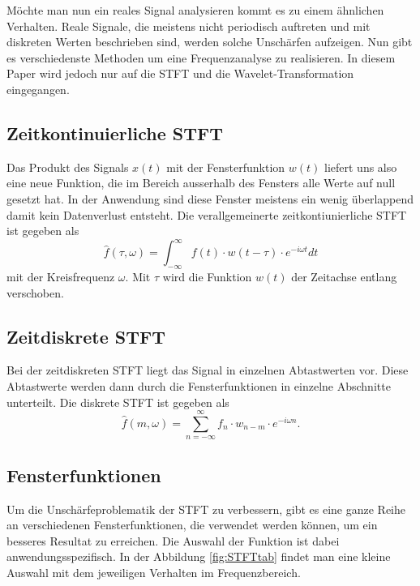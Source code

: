 Möchte man nun ein reales Signal analysieren kommt es zu einem ähnlichen Verhalten. Reale Signale, die meistens nicht periodisch auftreten und mit diskreten Werten beschrieben sind, werden solche Unschärfen aufzeigen. Nun gibt es verschiedenste Methoden um eine Frequenzanalyse zu realisieren. In diesem Paper wird jedoch nur auf die STFT und die Wavelet-Transformation eingegangen. 


\subsection{Zeitkontinuierliche STFT}

Das Produkt des Signals $x(t)$ mit der Fensterfunktion $w(t) $ liefert uns also eine neue Funktion, die im Bereich ausserhalb des Fensters alle Werte auf null gesetzt hat. In der Anwendung sind diese Fenster meistens ein wenig überlappend damit kein Datenverlust entsteht. Die verallgemeinerte zeitkontiunierliche STFT ist  gegeben als
\[
	\hat{f}(\tau, \omega)=\int_{-\infty}^{\infty} f(t)\cdot w(t-\tau)\cdot e^{-i \omega t} dt
\]
mit der Kreisfrequenz  $\omega $. Mit $\tau$ wird die Funktion $w(t)$ der Zeitachse entlang verschoben.

\subsection{Zeitdiskrete STFT}
Bei der zeitdiskreten STFT liegt das Signal in einzelnen Abtastwerten vor. Diese Abtastwerte werden dann durch die Fensterfunktionen in einzelne Abschnitte unterteilt. Die diskrete STFT ist gegeben als
\[
	\hat{f}(m, \omega)=\sum_{n=-\infty}^{\infty} f_{n} \cdot w_{n-m}\cdot e^{-i \omega n}.
\]


\subsection{Fensterfunktionen}
Um die Unschärfeproblematik der STFT zu verbessern, gibt es eine ganze Reihe an verschiedenen Fensterfunktionen, die verwendet werden können, um ein besseres Resultat zu erreichen. Die Auswahl der Funktion ist dabei anwendungsspezifisch. In der Abbildung \ref{fig:STFTtab} findet man eine kleine Auswahl mit dem jeweiligen Verhalten im Frequenzbereich. 


